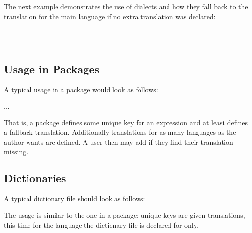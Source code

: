 \documentclass[DIV9,toc=index,toc=bib,numbers=noendperiod]{cnpkgdoc}
\begin{document}
The next example demonstrates the use of dialects and how they fall back to
the translation for the main language if no extra translation was declared:

\begin{beispiel}

  \\
  \\
\end{beispiel}

\subsection{Usage in Packages}
A typical usage in a package would look as follows:
\begin{beispiel}
 \RequirePackage{translations}
 ...
 \def\mypackage@title{\GetTranslation{mypackage-title}}
\end{beispiel}

That is, a package defines some unique key for an expression and at least
defines a fallback translation.  Additionally translations for as many
languages as the author wants are defined.  A user then may add
 if they find their
translation missing.

\subsection{Dictionaries}\label{sec:dictionaries}
A typical dictionary file should look as follows:

The usage is similar to the one in a package: unique keys are given
translations, this time for the language the dictionary file is declared for
only.
\end{document}
